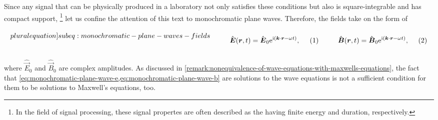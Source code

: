 \documentclass[11pt,a4paper,twoside,openany]{report}
\begin{document}
Since any signal that can be physically produced in a laboratory not only satisfies these conditions but also is square-integrable and has compact support,%
    \footnote{In the field of signal processing, these signal propertes are often described as the having finite energy and duration, respectively.}
let us confine the attention of this text to monochromatic plane waves. Therefore, the fields take on the form of\\
\begin{subequations}
    \label[pluralequation]{subeq:monochromatic-plane-waves-fields}
    \noindent\centering
    \begin{minipage}{0.45\textwidth}
        \begin{align}
            \label{eq:monochromatic-plane-wave-e}
            \hat{\vec E}(\vec r, t) &= \hat{\vec E}_0 \e^{\i(\vec k \cdot \vec r - \omega t)},
        \end{align}
    \end{minipage}
    \hfill
    \begin{minipage}{0.45\textwidth}
        \begin{align}
            \label{eq:monochromatic-plane-wave-b}
            \hat{\vec B}(\vec r, t) &= \hat{\vec B}_0 \e^{\i(\vec k \cdot \vec r - \omega t)},
        \end{align}
    \end{minipage}\bigskip
\end{subequations}\\
where $\hat{\vec E}_0$ and $\hat{\vec B}_0$ are complex amplitudes. As discussed in \cref{remark:nonequivalence-of-wave-equations-with-maxwells-equations}, the fact that \cref{eq:monochromatic-plane-wave-e,eq:monochromatic-plane-wave-b} are solutions to the wave equations is not a sufficient condition for them to be solutions to Maxwell's equations, too.
\end{document}
